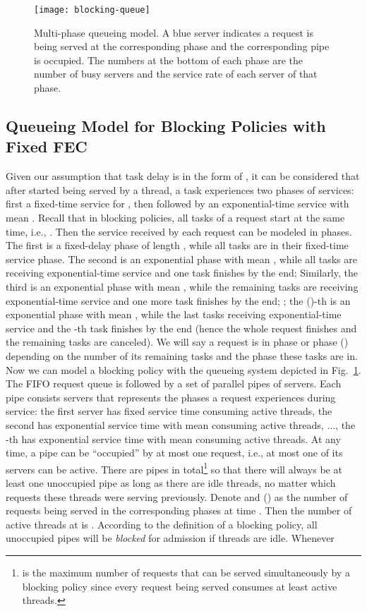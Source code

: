\documentclass[journal]{IEEEtran}
\begin{document}
\begin{figure}[t]
\centering
\texttt{[image: blocking-queue]}
\vspace{-20pt}
\caption{Multi-phase queueing model. A blue server indicates a request is being served at the corresponding phase and the corresponding pipe is occupied. The numbers at the bottom of each phase are the number of busy servers and the service rate of each server of that phase.}
\label{fig:blocking}
\vspace{-10pt}
\end{figure}

\subsection{Queueing Model for Blocking Policies with Fixed FEC}
Given our assumption that task delay is in the form of , it can be considered that after started being served by a thread, a task experiences two phases of services: first a fixed-time service for , then followed by an exponential-time service with mean . Recall that in blocking policies, all tasks of a request  start at the same time, i.e., . 
Then the service received by each request can be modeled in  phases. The first is a fixed-delay phase of length , while all  tasks are in their fixed-time service phase. The second is an exponential phase with mean , while all  tasks are receiving exponential-time service and one task finishes by the end; Similarly, the third is an exponential phase with mean , while the remaining  tasks are receiving exponential-time service and one more task finishes by the end; ; the ()-th is an exponential phase with mean , while the last  tasks receiving exponential-time service and the -th task finishes by the end (hence the whole request finishes and the remaining tasks are canceled). We will say a request is in phase  or phase  () depending on the number of its remaining tasks and the phase these tasks are in. 
Now we can model a blocking policy with the queueing system depicted in Fig.~\ref{fig:blocking}. 
The FIFO request queue is followed by a set of parallel pipes of servers. Each pipe consists  servers that represents the  phases a request experiences during service: the first server has fixed service time  consuming  active threads, the second has exponential service time with mean  consuming  active threads, ..., the -th has exponential service time with mean  consuming  active threads. At any time, a pipe can be ``occupied'' by at most one request, i.e., at most one of its servers can be active. There are  pipes in total\footnote{ is the maximum number of requests that can be served simultaneously by a blocking policy since every request being served consumes at least  active threads.} so that there will always be at least one unoccupied pipe as long as there are  idle threads, no matter which requests these threads were serving previously. 
Denote  and   () as the number of requests being served in the corresponding phases at time . Then the number of active threads at  is .
According to the definition of a blocking policy, all unoccupied pipes will be {\em blocked} for admission if  threads are idle. Whenever  
\end{document}
